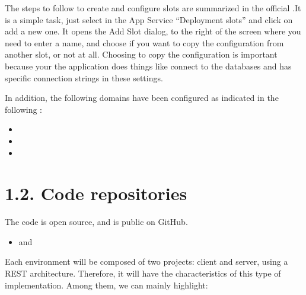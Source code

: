 \documentclass[letterpaper,10pt,english]{sphinxmanual}
\begin{document}
The steps to follow to create and configure slots are summarized in the official .It is a simple task, just select in the App Service “Deployment slots” and click on add a new one. It opens the Add Slot dialog, to the right of the screen where you need to enter a name, and choose if you want to copy the configuration from another slot, or not at all. Choosing to copy the configuration is important because your the application does things like connect to the databases and has specific connection strings in these settings.

In addition, the following domains have been configured as indicated in the following :
\begin{itemize}
\item {} 

\item {} 

\item {} 

\end{itemize}




\chapter{1.2. Code repositories}
\label{\detokenize{pages/Environments/Code_repository:code-repositories}}\label{\detokenize{pages/Environments/Code_repository::doc}}
The code is open source, and is public on GitHub.
\begin{itemize}
\item {} 
 and 

\end{itemize}

Each environment will be composed of two projects: client and server, using a REST architecture.
Therefore, it will have the characteristics of this type of implementation. Among them, we can mainly highlight:
\end{document}
